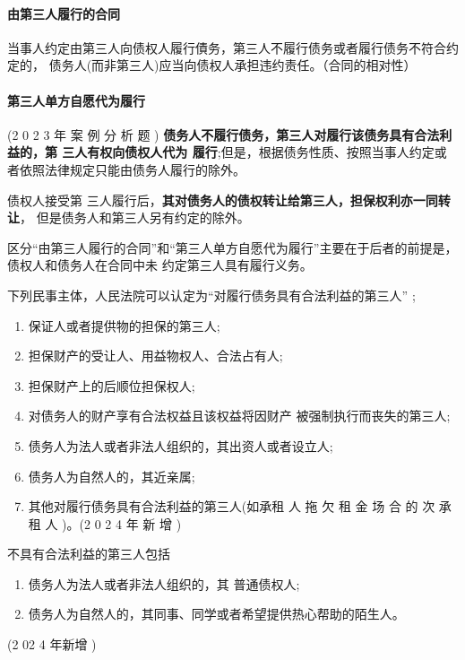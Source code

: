 \documentclass[UTF8,12pt]{ctexart}
\numberwithin{equation}{section} %
\numberwithin{figure}{section}
\numberwithin{table}{section}
\begin{document}
	\paragraph{由第三人履行的合同} 当事人约定由第三人向债权人履行債务，第三人不履行债务或者履行债务不符合约定的， 债务人(而非第三人)应当向债权人承担违约责任。（合同的相对性）
	
	\paragraph{第三人单方自愿代为履行} (2 0 2 3 年 案 例 分 析 题 ) 
	\textbf{债务人不履行债务，第三人对履行该债务具有合法利益的，第 三人有权向债权人代为 履行};但是，根据债务性质、按照当事人约定或者依照法律规定只能由债务人履行的除外。 
	
	债权人接受第 三人履行后，\textbf{其对债务人的债权转让给第三人，担保权利亦一同转让}， 但是债务人和第三人另有约定的除外。

	区分“由第三人履行的合同”和“第三人单方自愿代为履行”主要在于后者的前提是，债权人和债务人在合同中未 约定第三人具有履行义务。
	
	
	下列民事主体，人民法院可以认定为“对履行债务具有合法利益的第三人” ; 
	\begin{enumerate}
		\item 保证人或者提供物的担保的第三人;
		
		\item 担保财产的受让人、用益物权人、合法占有人; 
		
		\item 担保财产上的后顺位担保权人;
		
		\item 对债务人的财产享有合法权益且该权益将因财产 被强制执行而丧失的第三人;
		
		\item 债务人为法人或者非法人组织的，其出资人或者设立人; 
		
		\item 债务人为自然人的，其近亲属;
		
		\item 其他对履行债务具有合法利益的第三人(如承租 人 拖 欠 租 金 场 合 的 次 承 租 人 )。(2 0 2 4 年 新 增 )
	\end{enumerate}
	
	不具有合法利益的第三人包括
	\begin{enumerate}
		\item 债务人为法人或者非法人组织的，其 普通债权人;
		
		\item 债务人为自然人的，其同事、同学或者希望提供热心帮助的陌生人。 
	\end{enumerate}(2 02 4 年新增 )
	
\end{document}
